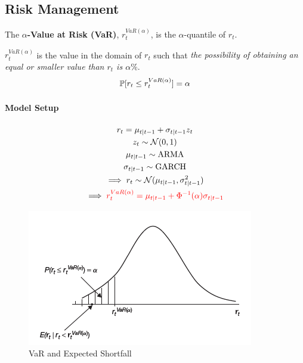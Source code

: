 \documentclass[11pt]{article}
\begin{document}
		\subsection{Risk Management}
			\begin{definition}
				The \textbf{$\alpha$-Value at Risk (VaR)}, $r_t^{VaR(\alpha)}$, is the $\alpha$-quantile of $r_t$.
			\end{definition}
			
			\begin{remark}[Interpretation]
				$r_t^{VaR(\alpha)}$ is the value in the domain of $r_t$ such that \emph{the possibility of obtaining an equal or smaller value than $r_t$ is $\alpha \%$}.
				\begin{equation}
					\mathbb{P}[{r_t \leq r_t^{VaR(\alpha)}}] = \alpha
				\end{equation}
			\end{remark}
	
			\paragraph{Model Setup}
				\begin{gather}
					r_t = \mu_{t|t-1} + \sigma_{t|t-1}z_t \\
					z_t \sim \mathcal{{N}}(0, 1) \\
					\mu_{t|t-1} \sim \text{{ARMA}} \\
					\sigma_{t|t-1} \sim \text{{GARCH}} \\
					\implies r_t \sim \mathcal{{N}}(\mu_{t|t-1}, \sigma_{t|t-1}^2) \\
					\implies \textcolor{red}{r_t^{VaR(\alpha)} = \mu_{t|t-1} + \Phi^{-1}(\alpha) \sigma_{t|t-1}}
				\end{gather}
				
			\begin{figure}[h]
				\centering
				\includegraphics[width=0.7\linewidth]{figures/lec12.png}
				\caption{VaR and Expected Shortfall}
			\end{figure}
			
\end{document}
